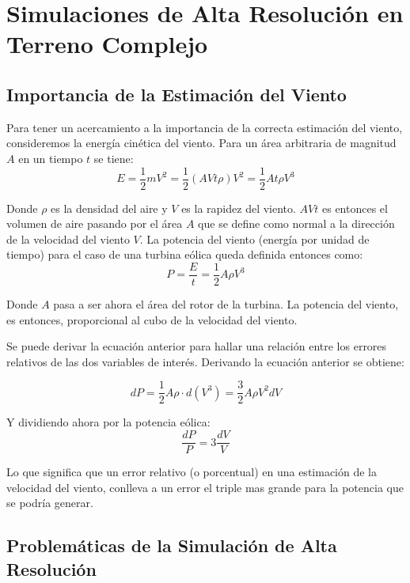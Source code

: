 \section{Simulaciones de Alta Resolución en Terreno Complejo}
\subsection{Importancia de la Estimación del Viento}
Para tener un acercamiento a la importancia de la correcta estimación del viento, consideremos la energía cinética del viento. Para un área arbitraria de magnitud $A$ en un tiempo $t$ se tiene:
\begin{equation} 
E = \frac{1}{2}mV^2 = \frac{1}{2}(AVt\rho)V^2 = \frac{1}{2}At\rho V^3
\end{equation}

Donde $\rho$ es la densidad del aire y $V$ es la rapidez del viento. $AVt$ es entonces el volumen de aire pasando por el área $A$ que se define como normal a la dirección de la velocidad del viento $V$. La potencia del viento (energía por unidad de tiempo) para el caso de una turbina eólica queda definida entonces como:
\begin{equation}
P = \frac{E}{t} = \frac{1}{2}A\rho V^3
\end{equation}

Donde $A$ pasa a ser ahora el área del rotor de la turbina. La potencia del viento, es entonces, proporcional al cubo de la velocidad del viento.

Se puede derivar la ecuación anterior para hallar una relación entre los errores relativos de las dos variables de interés. Derivando la ecuación anterior se obtiene:

\begin{equation}
dP = \frac{1}{2}A\rho\cdot d(V^3) = \frac{3}{2}A\rho V^2 dV
\end{equation}

Y dividiendo ahora por la potencia eólica:
\begin{equation}
\frac{dP}{P} = 3\frac{dV}{V}
\end{equation}

Lo que significa que un error relativo (o porcentual) en una estimación de la velocidad del viento, conlleva a un error el triple mas grande para la potencia que se podría generar.

\subsection{Problemáticas de la Simulación de Alta Resolución}

